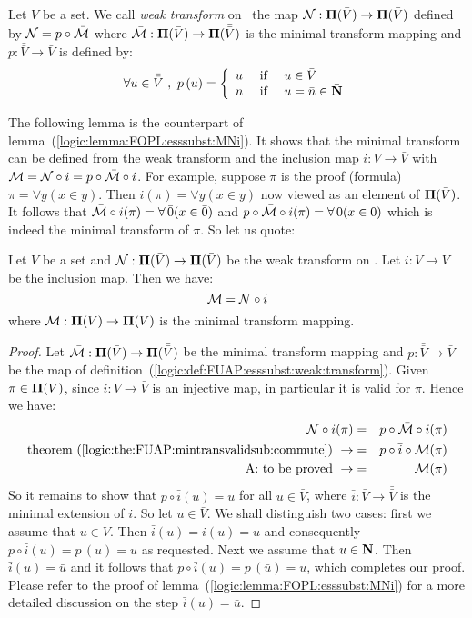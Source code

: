 \begin{defin}\label{logic:def:FUAP:esssubst:weak:transform}
Let $V$ be a set. We call {\em weak transform} on \pvsb\ the map
${\cal N}:\mbox{${\bf\Pi}(\bar{V})$}\to\mbox{${\bf\Pi}(\bar{V})$}$ defined by ${\cal N}=p\circ\bar{\cal M}$
where $\bar{\cal M}:\mbox{${\bf\Pi}(\bar{V})$}\to{\bf\Pi}(\bar{\bar{V}})$ is the minimal
transform mapping and $p:\bar{\bar{V}}\to\bar{V}$ is defined by:
    \[
    \forall u\in\bar{\bar{V}}\ ,\ p\,(u)=\left\{
        \begin{array}{lcl}
        u&\mbox{\ if\ }&u\in\bar{V}\\
        n&\mbox{\ if\ }&u=\bar{n}\in\bar{\N}
        \end{array}
    \right.
    \]
\end{defin}

The following lemma is the counterpart of
lemma~(\ref{logic:lemma:FOPL:esssubst:MNi}). It shows that the
minimal transform can be defined from the weak transform and the
inclusion map $i:V\to\bar{V}$ with ${\cal M}={\cal N}\circ
i=p\circ\bar{\cal M}\circ i$. For example, suppose $\pi$ is the
proof (formula) $\pi=\forall y(x\in y)$. Then $i(\pi)=\forall y(x\in
y)$ now viewed as an element of $\mbox{${\bf\Pi}(\bar{V})$}$. It follows that $\bar{\cal
M}\circ i(\pi)=\forall\,\bar{0}(x\in\bar{0})$ and $p\circ\bar{\cal
M}\circ i(\pi)=\forall\,0(x\in 0)$ which is indeed the minimal
transform of $\pi$. So let us quote:

\begin{lemma}\label{logic:lemma:FUAP:esssubst:MNi}
Let $V$ be a set and ${\cal N}:\mbox{${\bf\Pi}(\bar{V})$}\to\mbox{${\bf\Pi}(\bar{V})$}$ be the weak transform
on \pvsb. Let $i:V\to\bar{V}$ be the inclusion map. Then we have:
    \[
    {\cal M}={\cal N}\circ i
    \]
where ${\cal M}:\mbox{${\bf\Pi}(V)$}\to\mbox{${\bf\Pi}(\bar{V})$}$ is the minimal transform mapping.
\end{lemma}
\begin{proof}
Let $\bar{\cal M}:\mbox{${\bf\Pi}(\bar{V})$}\to{\bf\Pi}(\bar{\bar{V}})$ be the minimal
transform mapping and $p:\bar{\bar{V}}\to\bar{V}$ be the map of
definition~(\ref{logic:def:FUAP:esssubst:weak:transform}). Given
$\pi\in\mbox{${\bf\Pi}(V)$}$, since $i:V\to\bar{V}$ is an injective map, in
particular it is valid for $\pi$. Hence we have:
    \begin{eqnarray*}
    {\cal N}\circ i(\pi)&=&p\circ\bar{\cal M}\circ i(\pi)\\
    \mbox{theorem~(\ref{logic:the:FUAP:mintransvalidsub:commute})}\
    \rightarrow&=&p\circ\bar{i}\circ{\cal M}(\pi)\\
    \mbox{A: to be proved}\ \rightarrow&=&{\cal M}(\pi)
    \end{eqnarray*}
So it remains to show that $p\circ\bar{i}(u)=u$ for all
$u\in\bar{V}$, where $\bar{i}:\bar{V}\to\bar{\bar{V}}$ is the
minimal extension of $i$. So let $u\in\bar{V}$. We shall distinguish
two cases: first we assume that $u\in V$. Then $\bar{i}(u)=i(u)=u$
and consequently $p\circ\bar{i}(u)=p\,(u)=u$ as requested. Next we
assume that $u\in\mbox{$\bf N$}$. Then $\bar{i}(u)=\bar{u}$ and it follows that
$p\circ\bar{i}(u)=p\,(\bar{u})=u$, which completes our proof. Please
refer to the proof of lemma~(\ref{logic:lemma:FOPL:esssubst:MNi})
for a more detailed discussion on the step $\bar{i}(u)=\bar{u}$.
\end{proof}

